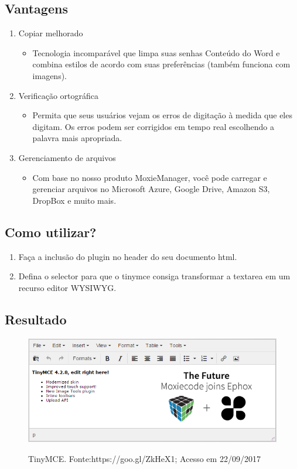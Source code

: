 \documentclass[12pt,a4paper]{article}
\begin{document}
\subsection{Vantagens}
\begin{enumerate}
\item Copiar melhorado
\begin{itemize}
\item Tecnologia incomparável que limpa suas senhas Conteúdo do Word e combina estilos de acordo com suas preferências (também funciona com imagens).
\end{itemize}
\item Verificação ortográfica
\begin{itemize}
\item Permita que seus usuários vejam os erros de digitação à medida que eles digitam. Os erros podem ser corrigidos em tempo real escolhendo a palavra mais apropriada.
\end{itemize}
\item Gerenciamento de arquivos
\begin{itemize}
\item Com base no nosso produto MoxieManager, você pode carregar e gerenciar arquivos no Microsoft Azure, Google Drive, Amazon S3, DropBox e muito mais.
\end{itemize}
\end{enumerate}

\subsection{Como utilizar?}
\begin{enumerate}
\item Faça a inclusão do plugin no header do seu documento html.


\item Defina o selector para que o tinymce consiga transformar a textarea em um recurso editor WYSIWYG.

\end{enumerate}

\subsection{Resultado}

\begin{figure}[h]
\centering
\includegraphics[width=13cm]{recursos/TinyMCE/TinyMCE.png}
\label{1}
\caption{TinyMCE. Fonte:https://goo.gl/ZkHeX1; Acesso em 22/09/2017}
\end{figure}
\end{document}

